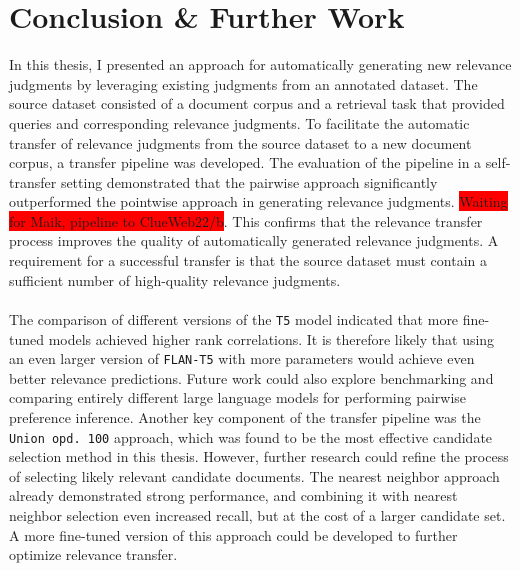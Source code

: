 \chapter{Conclusion \& Further Work}\label{conclusion}

In this thesis, I presented an approach for automatically generating new relevance judgments by leveraging existing judgments from an annotated dataset. The source dataset consisted of a document corpus and a retrieval task that provided queries and corresponding relevance judgments. To facilitate the automatic transfer of relevance judgments from the source dataset to a new document corpus, a transfer pipeline was developed. The evaluation of the pipeline in a self-transfer setting demonstrated that the pairwise approach significantly outperformed the pointwise approach in generating relevance judgments. \colorbox{red}{Waiting for Maik, pipeline to ClueWeb22/b}. This confirms that the relevance transfer process improves the quality of automatically generated relevance judgments. A  requirement for a successful transfer is that the source dataset must contain a sufficient number of high-quality relevance judgments.
\\\\
The comparison of different versions of the \texttt{T5} model indicated that more fine-tuned models achieved higher rank correlations. It is therefore likely that using an even larger version of \texttt{FLAN-T5} with more parameters would achieve even better relevance predictions. Future work could also explore benchmarking and comparing entirely different large language models for performing pairwise preference inference. Another key component of the transfer pipeline was the \texttt{Union opd.\ 100} approach, which was found to be the most effective candidate selection method in this thesis. However, further research could refine the process of selecting likely relevant candidate documents. The nearest neighbor approach already demonstrated strong performance, and combining it with nearest neighbor selection even increased recall, but at the cost of a larger candidate set. A more fine-tuned version of this approach could be developed to further optimize relevance transfer.


